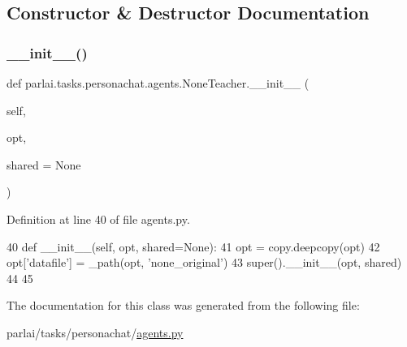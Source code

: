 \subsection{Constructor \& Destructor Documentation}
\mbox{\label{classparlai_1_1tasks_1_1personachat_1_1agents_1_1NoneTeacher_af7f3226c57f6d0c8fce6d670b03a4c2a}} 
\subsubsection{\texorpdfstring{\+\_\+\+\_\+init\+\_\+\+\_\+()}{\_\_init\_\_()}}
{\footnotesize\ttfamily def parlai.\+tasks.\+personachat.\+agents.\+None\+Teacher.\+\_\+\+\_\+init\+\_\+\+\_\+ (\begin{DoxyParamCaption}\item[{}]{self,  }\item[{}]{opt,  }\item[{}]{shared = {\ttfamily None} }\end{DoxyParamCaption})}



Definition at line 40 of file agents.\+py.


\begin{DoxyCode}
40     \textcolor{keyword}{def }\_\_init\_\_(self, opt, shared=None):
41         opt = copy.deepcopy(opt)
42         opt[\textcolor{stringliteral}{'datafile'}] = \_path(opt, \textcolor{stringliteral}{'none\_original'})
43         super().\_\_init\_\_(opt, shared)
44 
45 
\end{DoxyCode}


The documentation for this class was generated from the following file\+:\begin{DoxyCompactItemize}
\item 
parlai/tasks/personachat/\hyperlink{parlai_2tasks_2personachat_2agents_8py}{agents.\+py}\end{DoxyCompactItemize}
